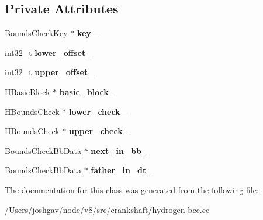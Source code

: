 \subsection*{Private Attributes}
\begin{DoxyCompactItemize}
\item 
\hyperlink{classv8_1_1internal_1_1_bounds_check_key}{Bounds\+Check\+Key} $\ast$ {\bfseries key\+\_\+}\hypertarget{classv8_1_1internal_1_1_bounds_check_bb_data_a18ec3e4c9e5618d86a0e4fe42180eb02}{}\label{classv8_1_1internal_1_1_bounds_check_bb_data_a18ec3e4c9e5618d86a0e4fe42180eb02}

\item 
int32\+\_\+t {\bfseries lower\+\_\+offset\+\_\+}\hypertarget{classv8_1_1internal_1_1_bounds_check_bb_data_ae9ecb6081170dd3aff0b65c9e974267f}{}\label{classv8_1_1internal_1_1_bounds_check_bb_data_ae9ecb6081170dd3aff0b65c9e974267f}

\item 
int32\+\_\+t {\bfseries upper\+\_\+offset\+\_\+}\hypertarget{classv8_1_1internal_1_1_bounds_check_bb_data_a21f17fa6ae7f6c00d09310ece03620f0}{}\label{classv8_1_1internal_1_1_bounds_check_bb_data_a21f17fa6ae7f6c00d09310ece03620f0}

\item 
\hyperlink{classv8_1_1internal_1_1_h_basic_block}{H\+Basic\+Block} $\ast$ {\bfseries basic\+\_\+block\+\_\+}\hypertarget{classv8_1_1internal_1_1_bounds_check_bb_data_ab9dfd57c7d6e5f9bf5fc0bd70d9c53ed}{}\label{classv8_1_1internal_1_1_bounds_check_bb_data_ab9dfd57c7d6e5f9bf5fc0bd70d9c53ed}

\item 
\hyperlink{classv8_1_1internal_1_1_h_bounds_check}{H\+Bounds\+Check} $\ast$ {\bfseries lower\+\_\+check\+\_\+}\hypertarget{classv8_1_1internal_1_1_bounds_check_bb_data_ab63457ab0e673a13bbb25b87a4065ebe}{}\label{classv8_1_1internal_1_1_bounds_check_bb_data_ab63457ab0e673a13bbb25b87a4065ebe}

\item 
\hyperlink{classv8_1_1internal_1_1_h_bounds_check}{H\+Bounds\+Check} $\ast$ {\bfseries upper\+\_\+check\+\_\+}\hypertarget{classv8_1_1internal_1_1_bounds_check_bb_data_aad4539ace72be943c38610508369dd80}{}\label{classv8_1_1internal_1_1_bounds_check_bb_data_aad4539ace72be943c38610508369dd80}

\item 
\hyperlink{classv8_1_1internal_1_1_bounds_check_bb_data}{Bounds\+Check\+Bb\+Data} $\ast$ {\bfseries next\+\_\+in\+\_\+bb\+\_\+}\hypertarget{classv8_1_1internal_1_1_bounds_check_bb_data_a07b8fd9e4b00f809dd754b95b9f74cb7}{}\label{classv8_1_1internal_1_1_bounds_check_bb_data_a07b8fd9e4b00f809dd754b95b9f74cb7}

\item 
\hyperlink{classv8_1_1internal_1_1_bounds_check_bb_data}{Bounds\+Check\+Bb\+Data} $\ast$ {\bfseries father\+\_\+in\+\_\+dt\+\_\+}\hypertarget{classv8_1_1internal_1_1_bounds_check_bb_data_a115d818b80f28e08cd43d774c5164e3b}{}\label{classv8_1_1internal_1_1_bounds_check_bb_data_a115d818b80f28e08cd43d774c5164e3b}

\end{DoxyCompactItemize}


The documentation for this class was generated from the following file\+:\begin{DoxyCompactItemize}
\item 
/\+Users/joshgav/node/v8/src/crankshaft/hydrogen-\/bce.\+cc\end{DoxyCompactItemize}
